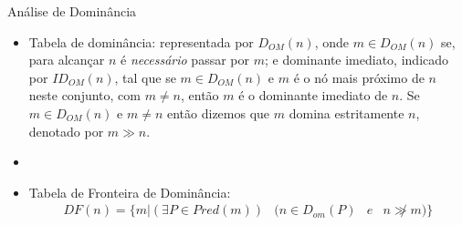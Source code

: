 \begin{frame}{Análise de Dominância}
    \begin{itemize}
        \item Tabela de dominância: representada por $D_{OM}(n)$, onde $m\in D_{OM}(n)$ se, para alcançar $n$ é \textit{necessário} passar por $m$; e dominante imediato, indicado por $ID_{OM}(n)$, tal que se $m\in D_{OM}(n)$ e $m$ é o nó mais próximo de $n$ neste conjunto, com $m \neq n$, então $m$ é o dominante imediato de $n$. Se $m \in D_{OM}(n)$ e $m\neq n$ então dizemos que $m$ domina estritamente $n$, denotado por $m\gg n$.
        \item[]

        \item Tabela de Fronteira de Dominância:
              \begin{equation}
                  \begin{matrix}
                      DF(n) = \{m | (\exists P \in Pred(m)) & (n \in D_{om}(P) & e & n \not\gg m)\}
                  \end{matrix}
              \end{equation}
    \end{itemize}

\end{frame}
